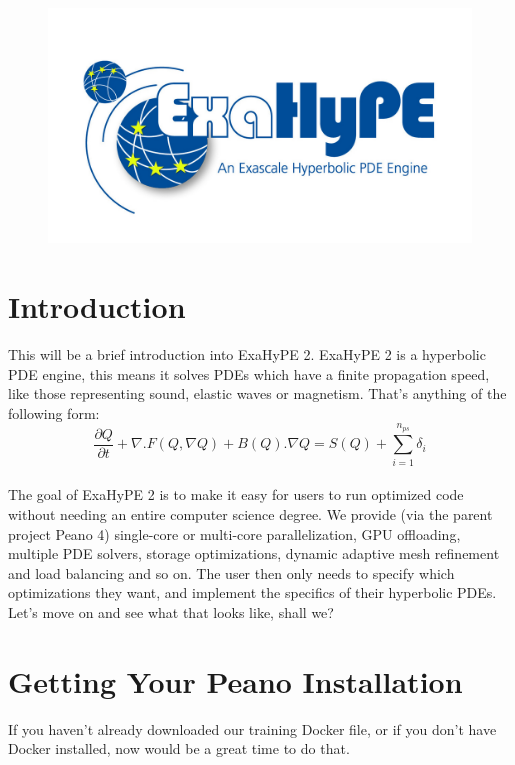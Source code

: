\documentclass[12pt,letterpaper]{article}
\begin{document}
\begin{figure}[!h]
\centering
\includegraphics[width=0.75\linewidth]{ExaHyPE_Logo.jpg}
\end{figure}

\section{Introduction}
\label{sec:Introduction}

\vspace{0.2cm}

This will be a brief introduction into ExaHyPE 2. ExaHyPE 2 is a hyperbolic PDE engine, this means it solves PDEs which have a finite propagation speed,
like those representing sound, elastic waves or magnetism. That's anything of the following form:\\

\begin{equation*}\label{ExaHyPE2_formulation}
    \frac{\partial Q}{\partial t} + \nabla . F(Q, \nabla Q) + B(Q) . \nabla Q= S(Q) + \sum_{i = 1}^{n_{ps}} \delta_i
\end{equation*}
\\

The goal of ExaHyPE 2 is to make it easy for users to run optimized code without needing an
entire computer science degree. We provide (via the parent project Peano 4) single-core or multi-core parallelization,
GPU offloading, multiple PDE solvers, storage optimizations, dynamic adaptive mesh refinement and load balancing and so on.
The user then only needs to specify which optimizations they want, and implement the specifics of their hyperbolic PDEs.\\

Let's move on and see what that looks like, shall we? \\

\newpage

\section{Getting Your Peano Installation}
\label{section_2}
If you haven't already downloaded our training Docker file, or if you don't have Docker installed, now would be a great time to do that.
\end{document}
